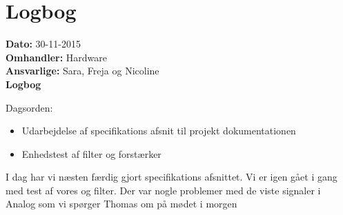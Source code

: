 \section{Logbog}

\textbf{Dato:} 30-11-2015 \\
\textbf{Omhandler:} Hardware \\
\textbf{Ansvarlige:} Sara, Freja og Nicoline \\
\textbf{Logbog}

Dagsorden:
\begin{itemize}
	\item Udarbejdelse af specifikations afsnit til projekt dokumentationen
	\item Enhedstest af filter og forstærker
\end{itemize}
I dag har vi næsten færdig gjort specifikations afsnittet. Vi er igen gået i gang med test af vores og filter. Der var nogle problemer med de viste signaler i Analog som vi spørger Thomas om på mødet i morgen\\